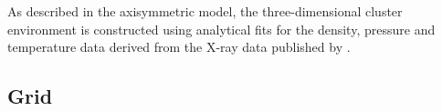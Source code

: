 
As described in the axisymmetric model, the three-dimensional cluster environment is constructed using analytical fits for the density, pressure and temperature data derived from the X-ray data published by \citet{david01}.
 




\subsection{Grid}
